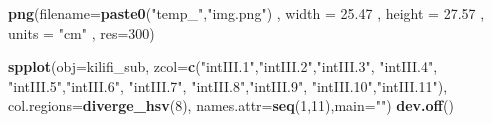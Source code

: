 \documentclass[]{article}
\newenvironment{Shaded}{\begin{snugshade}}{\end{snugshade}}
\newcommand{\KeywordTok}[1]{\textcolor[rgb]{0.13,0.29,0.53}{\textbf{#1}}}
\newcommand{\DataTypeTok}[1]{\textcolor[rgb]{0.13,0.29,0.53}{#1}}
\newcommand{\DecValTok}[1]{\textcolor[rgb]{0.00,0.00,0.81}{#1}}
\newcommand{\FloatTok}[1]{\textcolor[rgb]{0.00,0.00,0.81}{#1}}
\newcommand{\StringTok}[1]{\textcolor[rgb]{0.31,0.60,0.02}{#1}}
\newcommand{\NormalTok}[1]{#1}
\begin{document}
\begin{Shaded}
\begin{Highlighting}[]
{{{\KeywordTok{png}\NormalTok{(}\DataTypeTok{filename=}\KeywordTok{paste0}\NormalTok{(}\StringTok{"temp_"}\NormalTok{,}\StringTok{"img.png"}\NormalTok{) , }\DataTypeTok{width =} \FloatTok{25.47}\NormalTok{ , }\DataTypeTok{height =} \FloatTok{27.57}\NormalTok{ , }\DataTypeTok{units =} \StringTok{"cm"}\NormalTok{ , }\DataTypeTok{res=}\DecValTok{300}\NormalTok{)}

\KeywordTok{spplot}\NormalTok{(}\DataTypeTok{obj=}\NormalTok{kilifi_sub, }\DataTypeTok{zcol=}\KeywordTok{c}\NormalTok{(}\StringTok{"intIII.1"}\NormalTok{,}\StringTok{"intIII.2"}\NormalTok{,}\StringTok{"intIII.3"}\NormalTok{,}
                              \StringTok{"intIII.4"}\NormalTok{, }\StringTok{"intIII.5"}\NormalTok{,}\StringTok{"intIII.6"}\NormalTok{,}
                              \StringTok{"intIII.7"}\NormalTok{, }\StringTok{"intIII.8"}\NormalTok{,}\StringTok{"intIII.9"}\NormalTok{,}
                              \StringTok{"intIII.10"}\NormalTok{,}\StringTok{"intIII.11"}\NormalTok{), }
       \DataTypeTok{col.regions=}\KeywordTok{diverge_hsv}\NormalTok{(}\DecValTok{8}\NormalTok{),}
       \DataTypeTok{names.attr=}\KeywordTok{seq}\NormalTok{(}\DecValTok{1}\NormalTok{,}\DecValTok{11}\NormalTok{),}\DataTypeTok{main=}\StringTok{""}\NormalTok{)    }
\KeywordTok{dev.off}\NormalTok{()}

}}}
\end{Highlighting}
\end{Shaded}
\end{document}
